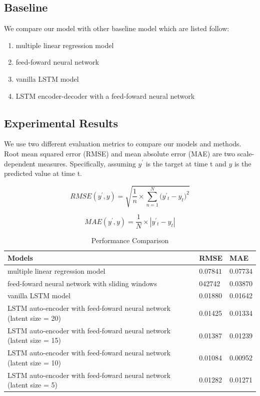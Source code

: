 \documentclass[5p]{elsarticle}
\begin{document}
\subsection{Baseline}
We compare our model with other baseline model which are listed follow:
\begin{enumerate}
  \item multiple linear regression model
  \item feed-foward neural network
  \item vanilla LSTM model
  \item LSTM encoder-decoder with a feed-foward neural network
\end{enumerate}

\subsection{Experimental Results}

We use two different evaluation metrics to compare our models and methods. Root mean squared error (RMSE) and mean absolute error (MAE) are two scale-dependent measures. Specifically, assuming $y^'$ is the target at time t and $y$ is the predicted value at time t. 


\begin{equation}
    RMSE(y^{'},y)=\sqrt{\frac{1}{n}\times{\sum_{n=1}^N(y^{'}{_t}-y_t})^2}
\end{equation}

\begin{equation}
	 MAE(y^{'},y)=\frac{1}{N}\times\left| y^{'}{_t}-y_t \right|
\end{equation}


\begin{table}[]
\centering
\caption{Performance Comparison}
\label{my-label}
\begin{tabular}{|l|l|l|}
\hline
Models & RMSE  & MAE\\
\hline
multiple linear regression model 
& $0.07841$   & $0.07734$ \\
\hline
feed-foward neural network with sliding windows 
& 042742 & 0.03870 \\
\hline
vanilla LSTM model
& 0.01880  & 0.01642 \\
\hline
LSTM auto-encoder with feed-foward neural network (latent size = 20)& 
0.01425 &  0.01334 \\
\hline
LSTM auto-encoder with feed-foward neural network (latent size = 15)& 
0.01387 &  0.01239 \\
\hline
LSTM auto-encoder with feed-foward neural network (latent size = 10)& 
0.01084 &  0.00952 \\
\hline
LSTM auto-encoder with feed-foward neural network (latent size = 5)& 
0.01282 & 0.01271 \\
\hline    
\end{tabular}
\end{table}
\end{document}
